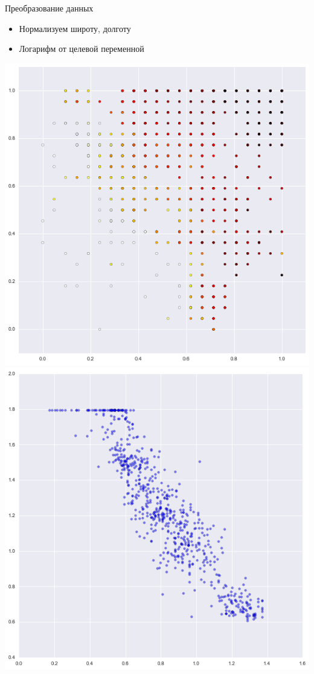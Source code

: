 \documentclass[aspectratio=169]{beamer}
\begin{document}
\begin{frame}{Преобразование данных}

\begin{itemize}
\item Нормализуем широту, долготу
\item Логарифм от целевой переменной
\end{itemize}

\begin{center}
\includegraphics[height=0.5\textheight]{images/small.png} \qquad
\includegraphics[height=0.5\textheight]{images/ds.png}
\end{center}

\end{frame}
\end{document}
